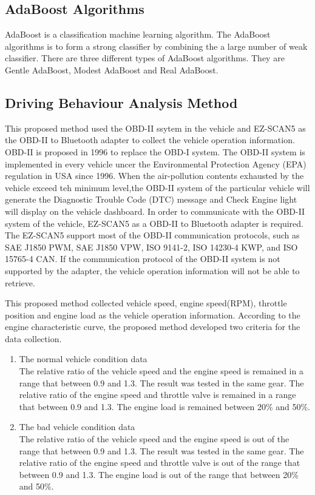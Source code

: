 \subsection{AdaBoost Algorithms}
AdaBoost is a classification machine learning algorithm. The AdaBoost algorithms is to form a strong classifier by combining the a large number of weak classifier. There are three different types of AdaBoost algorithms. They are Gentle AdaBoost, Modest AdaBoost and Real AdaBoost.

\subsection{Driving Behaviour Analysis Method}
This proposed method used the OBD-II ssytem in the vehicle and EZ-SCAN5 as the OBD-II to Bluetooth adapter to collect the vehicle operation information. OBD-II is proposed in 1996 to replace the OBD-I system. The OBD-II system is implemented in every vehicle uncer the Environmental Protection Agency (EPA) regulation in USA since 1996. When the air-pollution contents exhausted by the vehicle exceed teh minimum level,the OBD-II system of the particular vehicle will generate the Diagnostic Trouble Code (DTC) message and Check Engine light will display on the vehicle dashboard. In order to communicate with the OBD-II system of the vehicle, EZ-SCAN5 as a OBD-II to Bluetooth adapter is required. The EZ-SCAN5 support most of the OBD-II communication protocols, such as SAE J1850 PWM, SAE J1850 VPW, ISO 9141-2, ISO 14230-4 KWP, and ISO 15765-4 CAN. If the communication protocol of the OBD-II system is not supported by the adapter, the vehicle operation information will not be able to retrieve.

This proposed method collected vehicle speed, engine speed(RPM), throttle position and engine load as the vehicle operation information. According to the engine characteristic curve, the proposed method developed two criteria for the data collection.

\begin{enumerate}
\item The normal vehicle condition data \\
The relative ratio of the vehicle speed and the engine speed is remained in a range that between 0.9 and 1.3. The result was tested in the same gear. The relative ratio of the engine speed and throttle valve is remained in a range that between 0.9 and 1.3. The engine load is remained between 20\% and 50\%.  
\item The bad vehicle condition data \\
The relative ratio of the vehicle speed and the engine speed is out of the range that between 0.9 and 1.3. The result was tested in the same gear. The relative ratio of the engine speed and throttle valve is out of the range that between 0.9 and 1.3. The engine load is out of the range that between 20\% and 50\%.
\end{enumerate}

